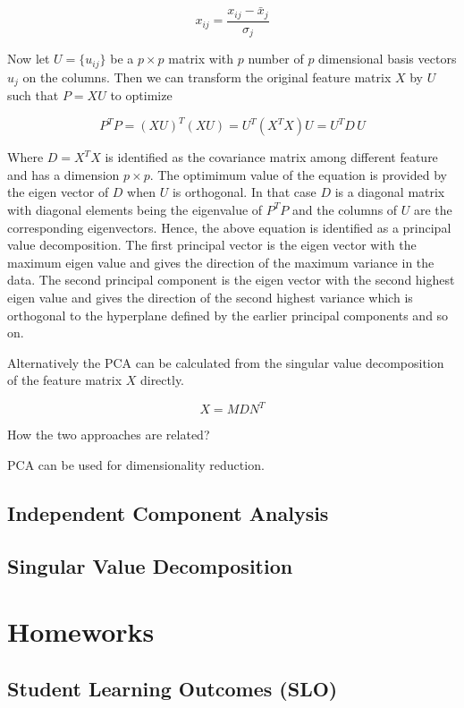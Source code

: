 \documentclass[11pt]{article}
\theoremstyle{definition}
\begin{document}
$$
x_{ij} = \frac{x_{ij} - \bar{x}_j}{\sigma_{j}}
$$

Now let $U = \{ u_{ij} \}$ be a $p\times p$ matrix with $p$ number of $p$ dimensional basis vectors $u_j$ on the columns. Then we can transform the original feature matrix $X$ by $U$ such that $P= X U$ to optimize 

$$
 P^T P = (X U)^T (X U) = U^T (X^T X) U = U^T D \, U
$$

Where $D = X^T X$ is identified as the covariance matrix among different feature and has a dimension $p\times p$. The optimimum value of the equation is provided by the eigen vector of $D$ when $U$ is orthogonal. In that case $D$ is a diagonal matrix with diagonal elements being the eigenvalue of $P^T P$ and the columns of $U$ are the corresponding eigenvectors. Hence, the above equation is identified as a principal value decomposition. The first principal vector is the eigen vector with the maximum eigen value and gives the direction of the maximum variance in the data. The second principal component is the eigen vector with the second highest eigen value and gives the direction of the second highest variance which is orthogonal to the hyperplane defined by the earlier principal components and so on. 



Alternatively the PCA can be calculated from the singular value decomposition of the feature matrix $X$ directly. 

$$
X = M D N^T
$$

How the two approaches are related?



PCA can be used for dimensionality reduction. 


\subsection{Independent Component Analysis}


\subsection{Singular Value Decomposition}





\newpage
\section{Homeworks}


\subsection*{Student Learning Outcomes (SLO)}
\end{document}
